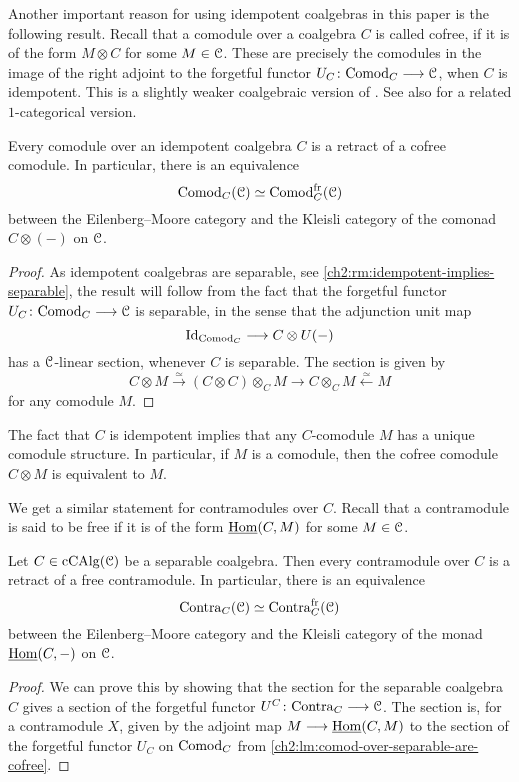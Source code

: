 Another important reason for using idempotent coalgebras in this paper is the following result. Recall that a comodule over a coalgebra $C$ is called cofree, if it is of the form $M\otimes C$ for some $M\in \EuScript{C}$. These are precisely the comodules in the image of the right adjoint to the forgetful functor $U_C\colon\mathrm{Comod}_C\longrightarrow \EuScript{C}$, when $C$ is idempotent. This is a slightly weaker coalgebraic version of \cite[1.13, 1.14]{ramzi_2023}. See also \cite[3.6]{brzezinski_2010} for a related $1$-categorical version. 

\begin{lemma}
    \label{ch2:lm:comod-over-separable-are-cofree}
    Every comodule over an idempotent coalgebra $C$ is a retract of a cofree comodule. In particular, there is an equivalence 
    \[\mathrm{Comod}_C(\EuScript{C})\simeq \mathrm{Comod}_C^{\mathrm{fr}}(\EuScript{C})\]
    between the Eilenberg--Moore category and the Kleisli category of the comonad $C\otimes (-)$ on $\EuScript{C}$. 
\end{lemma}
\begin{proof}
    As idempotent coalgebras are separable, see \cref{ch2:rm:idempotent-implies-separable}, the result will follow from the fact that the forgetful functor $U_C\colon \mathrm{Comod}_C\longrightarrow \EuScript{C}$ is separable, in the sense that the adjunction unit map 
    \[\mathrm{Id}_{\mathrm{Comod}_C}\longrightarrow C\otimes U(-)\]
    has a $\EuScript{C}$-linear section, whenever $C$ is separable. The section is given by 
    \[C\otimes M \overset{\simeq}\to (C\otimes C)\otimes_C M \to C\otimes_C M\overset{\simeq}\longleftarrow M\]
    for any comodule $M$. 
\end{proof}

\begin{remark}
    \label{ch2:rm:unique-structure}
    The fact that $C$ is idempotent implies that any $C$-comodule $M$ has a unique comodule structure. In particular, if $M$ is a comodule, then the cofree comodule $C\otimes M$ is equivalent to $M$. 
\end{remark}

We get a similar statement for contramodules over $C$. Recall that a contramodule is said to be free if it is of the form $\operatorname{\underline{Hom}}(C,M)$ for some $M\in \EuScript{C}$. 

\begin{proposition}
    \label{ch2:prop:contra-over-separable-are-free}
    Let $C\in \operatorname{cCAlg}(\EuScript{C})$ be a separable coalgebra. Then every contramodule over $C$ is a retract of a free contramodule. In particular, there is an equivalence 
    \[\mathrm{Contra}_C(\EuScript{C})\simeq \mathrm{Contra}_C^{\mathrm{fr}}(\EuScript{C})\]
    between the Eilenberg--Moore category and the Kleisli category of the monad $\operatorname{\underline{Hom}}(C,-)$ on $\EuScript{C}$. 
\end{proposition}
\begin{proof}
    We can prove this by showing that the section for the separable coalgebra $C$ gives a section of the forgetful functor $U^C\colon\mathrm{Contra}_C\longrightarrow \EuScript{C}$. The section is, for a contramodule $X$, given by the adjoint map $M\longrightarrow \operatorname{\underline{Hom}}(C, M)$ to the section of the forgetful functor $U_C$ on $\mathrm{Comod}_C$ from \cref{ch2:lm:comod-over-separable-are-cofree}.  
\end{proof}


